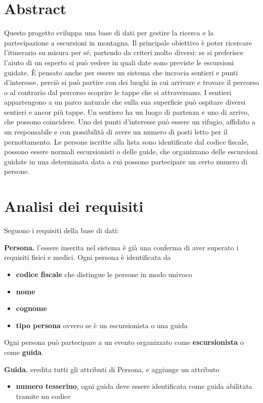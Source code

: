 \documentclass[10pt, a4paper]{article}
\begin{document}
\section{Abstract}
Questo progetto sviluppa una base di dati per gestire la ricerca e la partecipazione a escursioni in montagna. 
Il principale obiettivo è poter ricercare l'itinerario su misura per sé, partendo da criteri molto diversi: se si preferisce l'aiuto di un esperto si può vedere in quali date sono previste le escursioni guidate.
È pensato anche per essere un sistema che incrocia sentieri e punti d'interesse, perciò si può partire con dei luoghi in cui arrivare e trovare il percorso o al contrario dal percorso scoprire le tappe che si attraversano.
I sentieri appartengono a un parco naturale che sulla sua superficie può ospitare diversi sentieri e ancor più tappe. 
Un sentiero ha un luogo di partenza e uno di arrivo, che possono coincidere.
Uno dei punti d'interesse può essere un rifugio, affidato a un responsabile e con possibilità di avere un numero di posti letto per il pernottamento.
Le persone iscritte alla lista sono identificate dal codice fiscale, possono essere normali escursionisti o delle guide, che organizzano delle escursioni guidate in una determinata data a cui possono partecipare un certo numero di persone.

\section{Analisi dei requisiti}\label{sec:section1}
Seguono i requisiti della base di dati:

\noindent \textbf{Persona.} l'essere inserita nel sistema è già una conferma di aver superato i requisiti fisici e medici. Ogni persona è identificata da
\begin{itemize}
    \item \textbf{codice fiscale} che distingue le persone in modo univoco 
    \item \textbf{nome}
    \item \textbf{cognome} 
    \item \textbf{tipo persona} ovvero se è un escursionista o una guida
\end{itemize}

Ogni persona può partecipare a un evento organizzato come \textbf{escursionista} o come \textbf{guida}.

\noindent \textbf{Guida.} eredita tutti gli attributi di Persona, e aggiunge un attributo
\begin{itemize}
    \item \textbf{numero tesserino}, ogni guida deve essere identificata come guida abilitata tramite un codice
\end{itemize}
\end{document}
